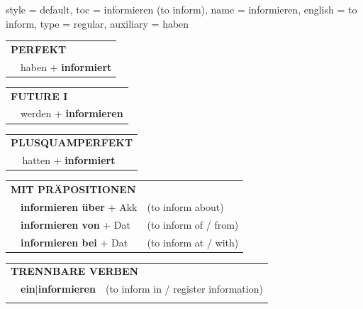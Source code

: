 \begin{verbentry}{
  style = {default},
  toc = {informieren (to inform)},
  name = {informieren},
  english = {to inform},
  type = {regular},
  auxiliary = {haben}
}
 \begin{tabular}{rl}
     \multicolumn{2}{l}{\textbf{PERFEKT}}\\
   & haben + \textbf{informiert}\\
  \end{tabular}
\hfill
\begin{tabular}{rl}
    \multicolumn{2}{l}{\textbf{FUTURE I}}\\
   & werden + \textbf{informieren}\\
  \end{tabular}
\hfill
\begin{tabular}{rl}
    \multicolumn{2}{l}{\textbf{PLUSQUAMPERFEKT}}\\
   & hatten + \textbf{informiert}\\
  \end{tabular}

 \vspace{10pt}

\begin{tabular}{lll}
      \multicolumn{3}{l}{\textbf{MIT PRÄPOSITIONEN}}\\
& \textbf{informieren über} + Akk & (to inform about)\\
& \textbf{informieren von} + Dat & (to inform of / from)\\
& \textbf{informieren bei} + Dat & (to inform at / with)\\
\end{tabular}
  \hfill
\begin{tabular}{lll}
      \multicolumn{3}{l}{\textbf{TRENNBARE VERBEN}}\\
 & \textbf{ein$|$informieren} & (to inform in / register information)\\
\vspace{20pt}
  \end{tabular}


\vspace{-5pt}
\end{verbentry}


